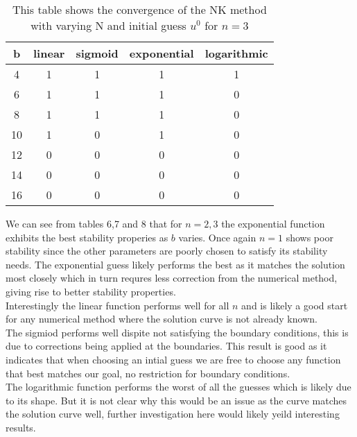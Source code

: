 \documentclass{article}
\begin{document}
\begin{table}[H]
\centering
\begin{tabular}{|c|c|c|c|c|}
\hline
b                                          & linear  & sigmoid & exponential & logarithmic \\
\hline
4                                          & 1 & 1 & 1 & 1\\
6                                          & 1 & 1 & 1 & 0\\
8                                          & 1 & 1 & 1 & 0\\
10                                         & 1 & 0 & 1 & 0\\
12                                         & 0 & 0 & 0 & 0\\
14                                         & 0 & 0 & 0 & 0\\
16                                         & 0 & 0 & 0 & 0\\
\hline
\end{tabular}
\caption{This table shows the convergence of the NK method with varying N and initial guess $u^0$ for $n=3$}
\end{table} 
We can see from tables 6,7 and 8 that for $n=2,3$ the exponential function exhibits the best stability properies as $b$ varies. Once again $n=1$ shows poor stability since the other parameters are poorly chosen to satisfy its stability needs. The exponential guess likely performs the best as it matches the solution most closely which in turn requres less correction from the numerical method, giving rise to better stability properties. \\
Interestingly the linear function performs well for all $n$ and is likely a good start for any numerical method where the solution curve is not already known. \\
The sigmiod performs well dispite not satisfying the boundary conditions, this is due to corrections being applied at the boundaries. This result is good as it indicates that when choosing an intial guess we are free to choose any function that best matches our goal, no restriction for boundary conditions. \\
The logarithmic function performs the worst of all the guesses which is likely due to its shape. But it is not clear why this would be an issue as the curve matches the solution curve well, further investigation here would likely yeild interesting results. \\
\end{document}
